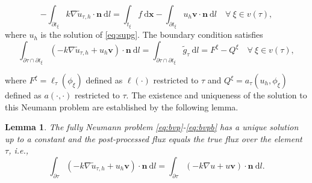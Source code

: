 \documentclass[times]{nlaauth}
\numberwithin{equation}{section}
\begin{document}
\begin{equation} \label{eq:bvp}
- \int_{\partial t_\xi } k \nabla \widetilde u_{\tau, h} \cdot \boldsymbol{n}  \ \text{d} l = \int_{t_\xi} f \ \text{d} \boldsymbol{x} - \int_{\partial t_\xi } u_h \boldsymbol{v} \cdot \boldsymbol{n}  \ \text{d} l  \quad \forall \ \xi\in v(\tau),
\end{equation}
where $u_h$ is the solution of \eqref{eq:supg}. The boundary condition satisfies
\begin{equation} \label{eq:bvpb}
 \int_{\partial \tau \cap \partial t_\xi } ( - k \nabla \widetilde u_{\tau, h}  +  u_h \boldsymbol{v} ) \cdot \boldsymbol{n}  \ \text{d} l =
\int_{\partial \tau \cap \partial t_\xi } \widetilde g_\tau  \ \text{d} l
= F^\xi - Q^\xi \quad \forall \ \xi\in v(\tau),
\end{equation}

\noindent
where $F^\xi = \ell_\tau(\phi_\xi)$ defined as $ \ell(\cdot)$ restricted to $\tau$ and $Q^\xi = a_\tau(u_h, \phi_\xi)$ defined as $a(\cdot, \cdot)$ restricted to $\tau.$ The existence and uniqueness of the solution to this Neumann problem are established by the following lemma.

\newtheorem{lem}{Lemma}[section]
\begin{lem}  \label{lem:maxerr}
The fully Neumann problem \eqref{eq:bvp}-\eqref{eq:bvpb} has a unique solution up to a constant and the post-processed flux equals the true flux over the element $\tau$, i.e.,
\begin{equation} \label{eq:fluxed}
\int_{\partial\tau } ( -k \nabla \widetilde u_{\tau, h} + u_h \boldsymbol{v} ) \cdot \boldsymbol{n}  \ \text{d} l = \int_{\partial\tau } ( -k \nabla u + u \boldsymbol{v} ) \cdot \boldsymbol{n}  \ \text{d} l.
\end{equation}
\end{lem}
\end{document}
